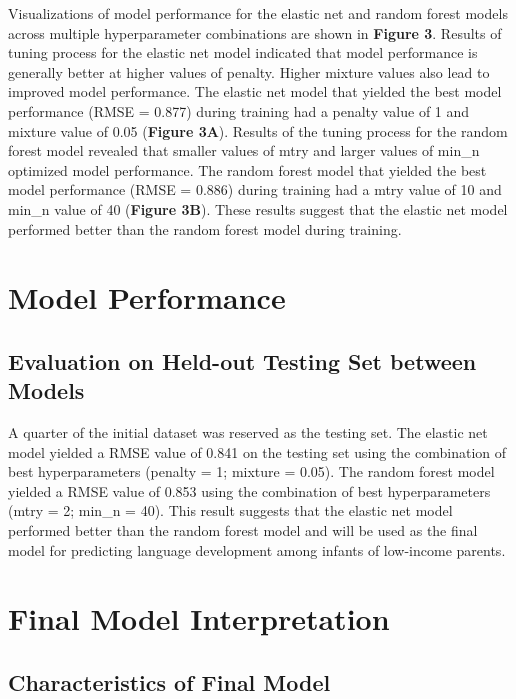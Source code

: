 \documentclass[sn-basic,pdflatex]{sn-jnl}
\begin{document}
Visualizations of model performance for the elastic net and random
forest models across multiple hyperparameter combinations are shown in
\textbf{Figure 3}. Results of tuning process for the elastic net model
indicated that model performance is generally better at higher values of
penalty. Higher mixture values also lead to improved model performance.
The elastic net model that yielded the best model performance (RMSE =
0.877) during training had a penalty value of 1 and mixture value of
0.05 (\textbf{Figure 3A}). Results of the tuning process for the random
forest model revealed that smaller values of mtry and larger values of
min\_n optimized model performance. The random forest model that yielded
the best model performance (RMSE = 0.886) during training had a mtry
value of 10 and min\_n value of 40 (\textbf{Figure 3B}). These results
suggest that the elastic net model performed better than the random
forest model during training.

\section{Model Performance}\label{model-performance}

\subsection{Evaluation on Held-out Testing Set between
Models}\label{evaluation-on-held-out-testing-set-between-models}

A quarter of the initial dataset was reserved as the testing set. The
elastic net model yielded a RMSE value of 0.841 on the testing set using
the combination of best hyperparameters (penalty = 1; mixture = 0.05).
The random forest model yielded a RMSE value of 0.853 using the
combination of best hyperparameters (mtry = 2; min\_n = 40). This result
suggests that the elastic net model performed better than the random
forest model and will be used as the final model for predicting language
development among infants of low-income parents.

\section{Final Model Interpretation}\label{final-model-interpretation}

\subsection{Characteristics of Final
Model}\label{characteristics-of-final-model}
\end{document}
